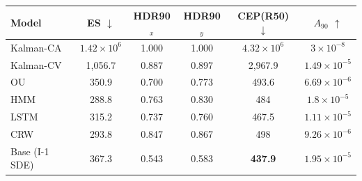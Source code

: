 \begin{tabular}{lccccc}
\toprule
Model & ES $\downarrow$ & HDR90$_x$ & HDR90$_y$ & CEP(R50) $\downarrow$ & $A_{90}$ $\uparrow$ \\
\midrule
Kalman-CA & $1.42\times10^{6}$ & 1.000 & 1.000 & $4.32\times10^{6}$ & $3\times10^{-8}$ \\
Kalman-CV & 1,056.7 & 0.887 & 0.897 & 2,967.9 & $1.49\times10^{-5}$ \\
OU & 350.9 & 0.700 & 0.773 & 493.6 & $6.69\times10^{-6}$ \\
HMM & 288.8 & 0.763 & 0.830 & 484 & $1.8\times10^{-5}$ \\
LSTM & 315.2 & 0.737 & 0.760 & 467.5 & $1.11\times10^{-5}$ \\
CRW & 293.8 & 0.847 & 0.867 & 498 & $9.26\times10^{-6}$ \\
Base (I-1 SDE) & 367.3 & 0.543 & 0.583 & \textbf{437.9} & \textbf{$1.95\times10^{-5}$} \\
\bottomrule
\end{tabular}
